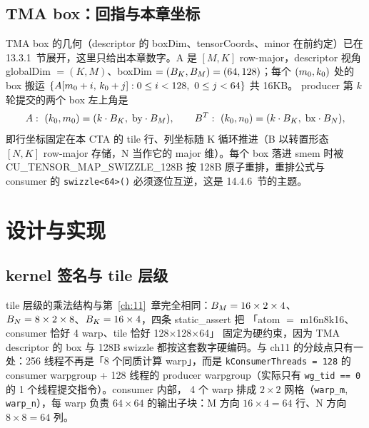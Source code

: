 \subsection{TMA box：回指与本章坐标}

TMA box 的几何（descriptor 的 boxDim、tensorCoords、minor 在前约定）已在
13.3.1~节展开，这里只给出本章数字。A 是 $[M, K]$ row-major，descriptor 视角
globalDim $= (K, M)$、boxDim $= (B\sb{K}, B\sb{M}) = (64, 128)$；每个
$(m\sb{0}, k\sb{0})$ 处的 box 搬运
$\{A[m\sb{0}+i,\, k\sb{0}+j] : 0 \le i < 128,\ 0 \le j < 64\}$ 共 16KB。
producer 第 $k$ 轮提交的两个 box 左上角是
\begin{equation}
  A:\ (k\sb{0}, m\sb{0}) = (k \cdot B\sb{K},\; \mathrm{by} \cdot B\sb{M}),
  \qquad
  B^{T}:\ (k\sb{0}, n\sb{0}) = (k \cdot B\sb{K},\; \mathrm{bx} \cdot B\sb{N}) ,
\end{equation}
即行坐标固定在本 CTA 的 tile 行、列坐标随 K 循环推进（B 以转置形态
$[N, K]$ row-major 存储，N 当作它的 major 维）。每个 box 落进 smem 时被
CU\_TENSOR\_MAP\_SWIZZLE\_128B 按 128B 原子重排，重排公式与 consumer 的
\texttt{swizzle\allowbreak{}<64>\allowbreak{}()} 必须逐位互逆，这是 14.4.6~节的主题。

\section{设计与实现}

\subsection{kernel 签名与 tile 层级}



tile 层级的乘法结构与第~\ref{ch:11}~章完全相同：$B\sb{M} = 16 \times 2 \times 4$、
$B\sb{N} = 8 \times 2 \times 8$、$B\sb{K} = 16 \times 4$，四条 static\_assert 把
「atom $=$ m16n8k16、consumer 恰好 4 warp、tile 恰好 128$\times$128$\times$64」
固定为硬约束，因为 TMA descriptor 的 box 与 128B swizzle 都按这套数字硬编码。与
ch11 的分歧点只有一处：256 线程不再是「8 个同质计算 warp」，而是
\texttt{k\allowbreak{}Consumer\allowbreak{}Threads =\allowbreak{} 128} 的 consumer warpgroup + 128 线程的 producer
warpgroup（实际只有 \texttt{wg\_tid == 0} 的 1 个线程提交指令）。consumer 内部，
4 个 warp 排成 $2\times2$ 网格（\texttt{warp\_m}, \texttt{warp\_n}），每 warp
负责 $64 \times 64$ 的输出子块：M 方向 $16 \times 4 = 64$ 行、N 方向
$8 \times 8 = 64$ 列。

